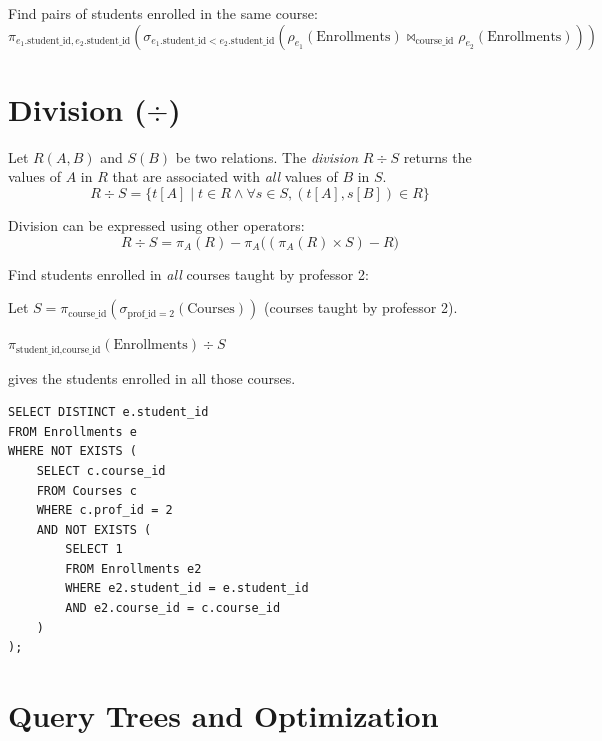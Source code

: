 \begin{example}
Find pairs of students enrolled in the same course:
\[
\pi_{e_1.\text{student\_id}, e_2.\text{student\_id}}(
    \sigma_{e_1.\text{student\_id} < e_2.\text{student\_id}}(
        \rho_{e_1}(\text{Enrollments}) \bowtie_{\text{course\_id}} \rho_{e_2}(\text{Enrollments})
    )
)
\]
\end{example}

\section{Division ($\div$)}

\begin{definition}[Division]
Let $R(A, B)$ and $S(B)$ be two relations. The \emph{division} $R \div S$
returns the values of $A$ in $R$ that are associated with \emph{all}
values of $B$ in $S$.
\[
R \div S = \{ t[A] \mid t \in R \land \forall s \in S, (t[A], s[B]) \in R \}
\]
\end{definition}

\begin{theorem}
Division can be expressed using other operators:
\[
R \div S = \pi_A(R) - \pi_A\big((\pi_A(R) \times S) - R\big)
\]
\end{theorem}

\begin{example}
Find students enrolled in \emph{all} courses taught by professor 2:

Let $S = \pi_{\text{course\_id}}(\sigma_{\text{prof\_id}=2}(\text{Courses}))$
(courses taught by professor 2).

$\pi_{\text{student\_id}, \text{course\_id}}(\text{Enrollments}) \div S$

gives the students enrolled in all those courses.

\begin{codeblock}[title=\textbf{Division in SQL (NOT EXISTS)}]
\begin{verbatim}
SELECT DISTINCT e.student_id
FROM Enrollments e
WHERE NOT EXISTS (
    SELECT c.course_id
    FROM Courses c
    WHERE c.prof_id = 2
    AND NOT EXISTS (
        SELECT 1
        FROM Enrollments e2
        WHERE e2.student_id = e.student_id
        AND e2.course_id = c.course_id
    )
);
\end{verbatim}
\end{codeblock}
\end{example}

\section{Query Trees and Optimization}

